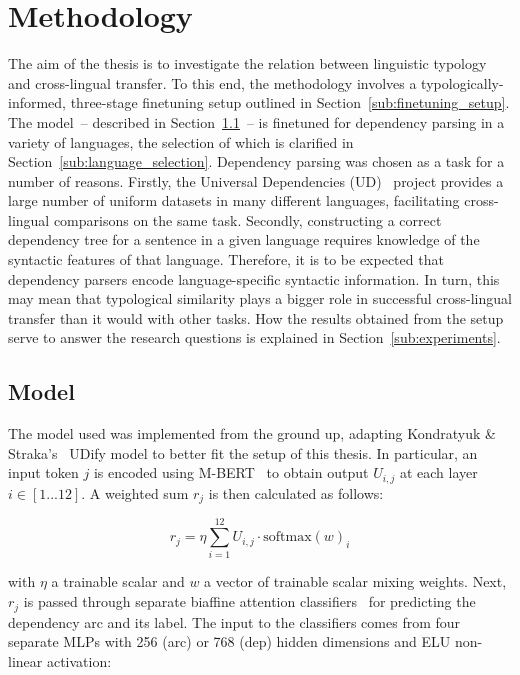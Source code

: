 \setcounter{section}{2}
\section{Methodology}
\label{sec:methodology}

	The aim of the thesis is to investigate the relation between linguistic typology and cross-lingual transfer. To this end, the methodology involves a typologically-informed, three-stage finetuning setup outlined in Section~\ref{sub:finetuning_setup}. The model~-- described in Section~\ref{sub:model}~-- is finetuned for dependency parsing in a variety of languages, the selection of which is clarified in Section~\ref{sub:language_selection}. Dependency parsing was chosen as a task for a number of reasons. Firstly, the Universal Dependencies (UD)~\cite{nivre-etal-2016-universal} project provides a large number of uniform datasets in many different languages, facilitating cross-lingual comparisons on the same task. Secondly, constructing a correct dependency tree for a sentence in a given language requires knowledge of the syntactic features of that language. Therefore, it is to be expected that dependency parsers encode language-specific syntactic information. In turn, this may mean that typological similarity plays a bigger role in successful cross-lingual transfer than it would with other tasks. How the results obtained from the setup serve to answer the research questions is explained in Section~\ref{sub:experiments}.

	\subsection{Model}
	\label{sub:model}
		The model used was implemented from the ground up, adapting Kondratyuk \& Straka's~\cite{kondratyuk-straka-2019-75} UDify model to better fit the setup of this thesis. In particular, an input token $j$ is encoded using M-BERT~\cite{devlin-etal-2019-bert} to obtain output $U_{i,j}$ at each layer $i \in [1...12]$. A weighted sum $r_j$ is then calculated as follows:

		$$
			r_j = \eta \sum_{i=1}^{12}U_{i,j} \cdot \text{softmax}(w)_i
		$$

		\noindent with $\eta$ a trainable scalar and $w$ a vector of trainable scalar mixing weights. Next, $r_j$ is passed through separate biaffine attention classifiers~\cite{dozat-manning-2016-deep} for predicting the dependency arc and its label. The input to the classifiers comes from four separate MLPs with 256 (arc) or 768 (dep) hidden dimensions and ELU non-linear activation:


